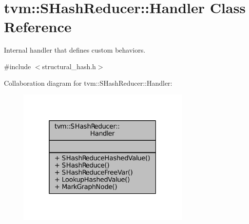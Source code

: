 \hypertarget{classtvm_1_1SHashReducer_1_1Handler}{}\section{tvm\+:\+:S\+Hash\+Reducer\+:\+:Handler Class Reference}
\label{classtvm_1_1SHashReducer_1_1Handler}


Internal handler that defines custom behaviors.  




{\ttfamily \#include $<$structural\+\_\+hash.\+h$>$}



Collaboration diagram for tvm\+:\+:S\+Hash\+Reducer\+:\+:Handler\+:
\nopagebreak
\begin{figure}[H]
\begin{center}
\leavevmode
\includegraphics[width=244pt]{classtvm_1_1SHashReducer_1_1Handler__coll__graph}
\end{center}
\end{figure}
